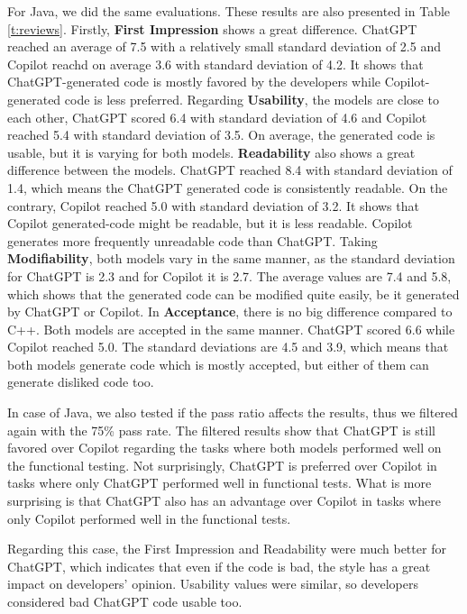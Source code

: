 For Java, we did the same evaluations.
These results are also presented in Table \ref{t:reviews}.
Firstly, \textbf{First Impression} shows a great difference.
ChatGPT reached an average of 7.5 with a relatively small standard deviation of 2.5 and Copilot reachd on average 3.6 with standard deviation of 4.2.
It shows that ChatGPT-generated code is mostly favored by the developers while Copilot-generated code is less preferred.
Regarding \textbf{Usability}, the models are close to each other, ChatGPT scored 6.4 with standard deviation of 4.6 and Copilot reached 5.4 with standard deviation of 3.5.
On average, the generated code is usable, but it is varying for both models.
\textbf{Readability} also shows a great difference between the models.
ChatGPT reached 8.4 with standard deviation of 1.4, which means the ChatGPT generated code is consistently readable.
On the contrary, Copilot reached 5.0 with standard deviation of 3.2.
It shows that Copilot generated-code might be readable, but it is less readable.
Copilot generates more frequently unreadable code than ChatGPT.
Taking \textbf{Modifiability}, both models vary in the same manner, as the standard deviation for ChatGPT is 2.3 and for Copilot it is 2.7.
The average values are 7.4 and 5.8, which shows that the generated code can be modified quite easily, be it generated by ChatGPT or Copilot.
In \textbf{Acceptance}, there is no big difference compared to C++.
Both models are accepted in the same manner.
ChatGPT scored 6.6 while Copilot reached 5.0.
The standard deviations are 4.5 and 3.9, which means that both models generate code which is mostly accepted, but either of them can generate disliked code too.

In case of Java, we also tested if the pass ratio affects the results, thus we filtered again with the 75\% pass rate.
The filtered results show that ChatGPT is still favored over Copilot regarding the tasks where both models performed well on the functional testing.
Not surprisingly, ChatGPT is preferred over Copilot in tasks where only ChatGPT performed well in functional tests.
What is more surprising is that ChatGPT also has an advantage over Copilot in tasks where only Copilot performed well in the functional tests.

Regarding this case, the First Impression and Readability were much better for ChatGPT, which indicates that even if the code is bad, the style has a great impact on developers' opinion.
Usability values were similar, so developers considered bad ChatGPT code usable too.

